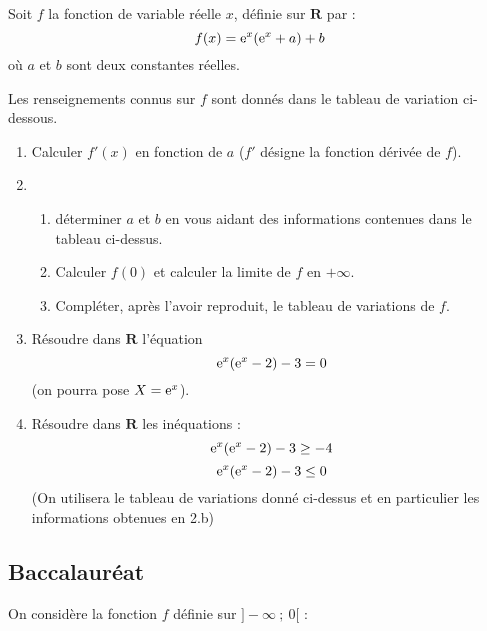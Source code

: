 \begin{tkzexample}
  Soit $f$ la fonction de variable réelle $x$, définie sur $\mathbf{R}$ par :
  \[
      f(x)=\mathrm{e}^x(\mathrm{e}^x+a)+b
  \]
  où $a$ et $b$ sont deux constantes réelles.

  Les renseignements connus sur $f$ sont donnés dans le tableau de variation ci-dessous.

  \medskip
  \begin{center}
  \end{center}

  \medskip
  \begin{enumerate}
      \item Calculer $f'(x)$ en fonction de $a$ ($f'$ désigne la fonction dérivée de $f$).
      \item \begin{enumerate}
             \item déterminer $a$ et $b$ en vous aidant des informations contenues dans le
              tableau ci-dessus.
             \item Calculer $f(0)$ et calculer la limite de $f$ en $+\infty$.
             \item Compléter, après l'avoir reproduit, le tableau de variations de $f$.
             \end{enumerate}
      \item Résoudre dans $\mathbf{R}$ l'équation
      \[
          \mathrm{e}^x(\mathrm{e}^x-2)-3=0
      \]
      (on pourra pose $X=\mathrm{e}^x$).
      \item Résoudre dans $\mathbf{R}$ les inéquations :
      \[
          \mathrm{e}^x(\mathrm{e}^x-2)-3\geq -4
      \]
      \[
          \mathrm{e}^x(\mathrm{e}^x-2)-3 \leq 0
      \]
       (On utilisera le tableau de variations donné ci-dessus et en particulier les
        informations obtenues en 2.b)
  \end{enumerate}
\end{tkzexample}


\subsection{Baccalauréat}
	On considère la fonction $f$ définie sur $]-\infty~;~0[$ :

